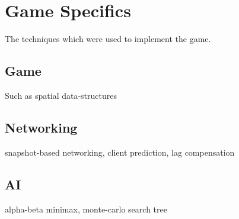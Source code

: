 \documentclass[class=article, crop=false]{standalone}
\begin{document}
	\section{Game Specifics}
		The techniques which were used to implement the game.

		\subsection{Game}
			Such as spatial data-structures

		\subsection{Networking}
			snapshot-based networking, client prediction, lag compensation

		\subsection{AI}
			alpha-beta minimax, monte-carlo search tree
\end{document}
